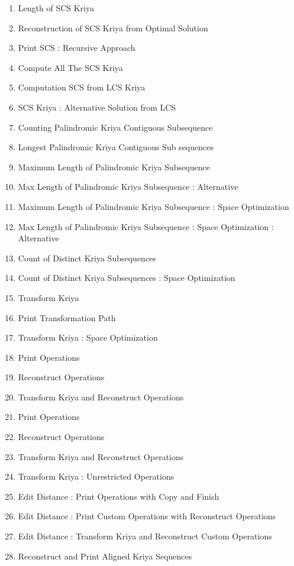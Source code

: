 \begin{enumerate}[noitemsep]
    \item  Length of SCS Kriya 
    \item  Reconstruction of SCS Kriya from Optimal Solution 
    \item  Print SCS : Recursive Approach
    \item  Compute All The SCS Kriya 
    \item  Computation SCS from LCS Kriya
    \item  SCS Kriya : Alternative Solution from LCS 
    \item  Counting Palindromic Kriya Contiguous Subsequence 
    \item  Longest Palindromic Kriya Contiguous Sub sequences
    \item  Maximum Length of Palindromic Kriya Subsequence 
    \item  Max Length of Palindromic Kriya Subsequence : Alternative
    \item  Maximum Length of Palindromic Kriya Subsequence : Space Optimization 
    \item  Max Length of Palindromic Kriya Subsequence : Space Optimization : Alternative 
    \item  Count of Distinct Kriya Subsequences
    \item  Count of Distinct Kriya Subsequences : Space Optimization 
    \item  Transform Kriya 
    \item  Print Transformation Path 
    \item  Transform Kriya : Space Optimization
    \item Print Operations
    \item Reconstruct Operations
    \item Transform Kriya and Reconstruct Operations 
    \item Print Operations
    \item Reconstruct Operations 
    \item Transform Kriya and Reconstruct Operations 
    \item Transform Kriya : Unrestricted Operations 
    \item Edit Distance : Print Operations with Copy and Finish 
    \item Edit Distance : Print Custom Operations with Reconstruct Operations 
    \item Edit Distance : Transform Kriya and Reconstruct Custom Operations 
    \item Reconstruct and Print Aligned Kriya Sequences 

\end{enumerate}
